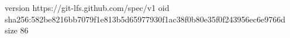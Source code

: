 version https://git-lfs.github.com/spec/v1
oid sha256:582be8216bb7079f1e813b5d65977930f1ac38f0b80e35f0f243956ec6e9766d
size 86
